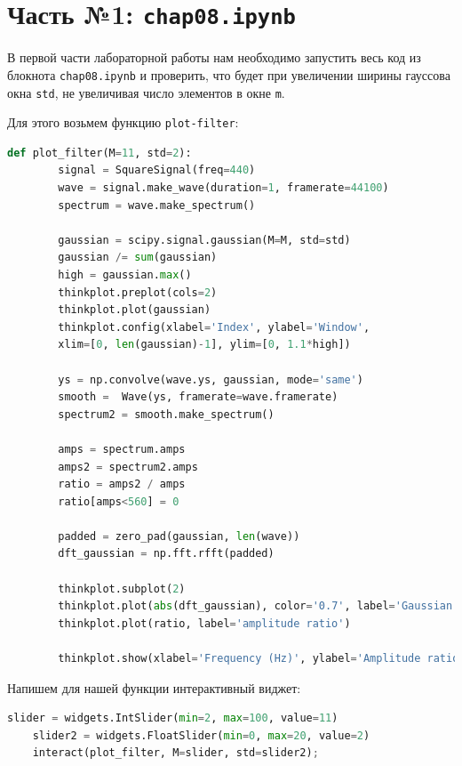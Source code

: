 \documentclass[a4paper]{article}
\begin{document}
    \newpage
        \section{Часть №1: \texttt{chap08.ipynb}}
            В первой части лабораторной работы нам необходимо запустить весь код из блокнота \texttt{chap08.ipynb} и проверить, что будет при увеличении ширины гауссова окна \texttt{std}, не увеличивая число элементов в окне \texttt{m}.
            
            Для этого возьмем функцию \texttt{plot-filter}:
            
\begin{lstlisting}[language=Python, caption= Функция \texttt{plot-filter}]
    def plot_filter(M=11, std=2):
        signal = SquareSignal(freq=440)
        wave = signal.make_wave(duration=1, framerate=44100)
        spectrum = wave.make_spectrum()
    
        gaussian = scipy.signal.gaussian(M=M, std=std)
        gaussian /= sum(gaussian)
        high = gaussian.max()
        thinkplot.preplot(cols=2)
        thinkplot.plot(gaussian)
        thinkplot.config(xlabel='Index', ylabel='Window',
        xlim=[0, len(gaussian)-1], ylim=[0, 1.1*high])
    
        ys = np.convolve(wave.ys, gaussian, mode='same')
        smooth =  Wave(ys, framerate=wave.framerate)
        spectrum2 = smooth.make_spectrum()
        
        amps = spectrum.amps
        amps2 = spectrum2.amps
        ratio = amps2 / amps    
        ratio[amps<560] = 0
    
        padded = zero_pad(gaussian, len(wave))
        dft_gaussian = np.fft.rfft(padded)
    
        thinkplot.subplot(2)
        thinkplot.plot(abs(dft_gaussian), color='0.7', label='Gaussian filter')
        thinkplot.plot(ratio, label='amplitude ratio')
        
        thinkplot.show(xlabel='Frequency (Hz)', ylabel='Amplitude ratio')
\end{lstlisting}
            
            Напишем для нашей функции интерактивный виджет:
            
\begin{lstlisting}[language=Python, caption= Интерактивный виджет для функции \texttt{plot-filter}]
    slider = widgets.IntSlider(min=2, max=100, value=11)
    slider2 = widgets.FloatSlider(min=0, max=20, value=2)
    interact(plot_filter, M=slider, std=slider2);
\end{lstlisting}
            
\end{document}
